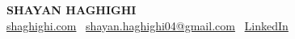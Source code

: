 
\newcommand{\blueunderlinelink}[2]{{\href{#1}{\textcolor{myblue}{#2}}}}


\begin{center}
{\LARGE \textbf{SHAYAN HAGHIGHI}}
    \\
    \vspace{6pt}
    \blueunderlinelink{https://shaghighi.com}{shaghighi.com} \textbar\ \blueunderlinelink{mailto:shayan.haghighi04@gmail.com}{shayan.haghighi04@gmail.com} \textbar\  \blueunderlinelink{https://www.linkedin.com/in/shayan-haghighi-a0030a229}{LinkedIn}
\end{center}
